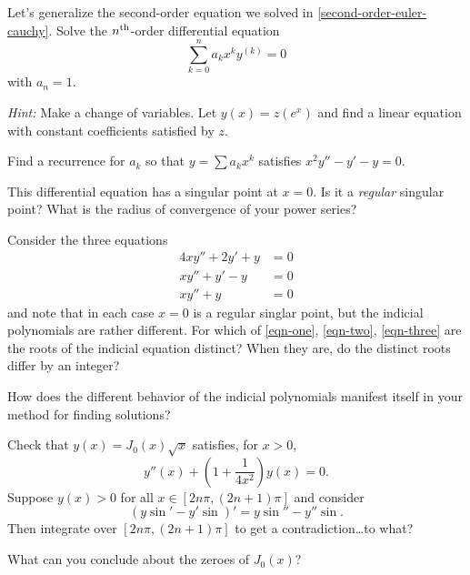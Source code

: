 \documentclass{homework}
\begin{document}
\begin{problem}
  Let's generalize the second-order equation we solved in
  \ref{second-order-euler-cauchy}.  Solve the
  $n^{\mbox{\scriptsize th}}$-order differential equation
  \[
    \sum_{k=0}^n a_k x^k y^{(k)} = 0
  \]
  with $a_n = 1$.

  \textit{Hint:} Make a change of variables.  Let $y(x) = z(e^x)$ and
  find a linear equation with constant coefficients satisfied by $z$.
\end{problem}

\begin{problem}
  Find a recurrence for $a_k$ so that $y = \sum a_k x^k$ satisfies \(x^2 y'' - y' - y = 0\).

  This differential equation has a singular point at $x = 0$.  Is it a
  \textit{regular} singular point?  What is the radius of convergence
  of your power series?
\end{problem}

\begin{problem}
  Consider the three equations
  \begin{align}
    4xy'' + 2y' + y &= 0 \label{eqn-one}\\
    x y'' + y' - y &= 0 \label{eqn-two}\\
    x y'' + y &= 0 \label{eqn-three}
  \end{align}
  and note that in each case $x=0$ is a regular singlar point, but the
  indicial polynomials are rather different.  For which of
  \eqref{eqn-one}, \eqref{eqn-two}, \eqref{eqn-three} are the roots of
  the indicial equation distinct?  When they are, do the distinct
  roots differ by an integer?

  How does the different behavior of the indicial polynomials manifest
  itself in your method for finding solutions?
\end{problem}


\begin{problem}\label{finding-zeroes-of-bessel}Check that $y(x) = J_0(x) \sqrt{x}$ satisfies, for $x > 0$,
  \[
    y''(x) + \left( 1 + \frac{1}{4x^2} \right) y(x) = 0.
  \]
  Suppose $y(x) > 0$ for all $x \in [2 n \pi, (2n+1) \pi]$ and consider
  \[
    \left( y \sin' - y' \sin \right)' = y \sin '' - y'' \sin. %
  \]
  Then integrate over $[2n \pi, (2n+1) \pi]$ to get a
  contradiction\ldots to what?

  What can you conclude about the zeroes of $J_0(x)$?
\end{problem}
\end{document}

